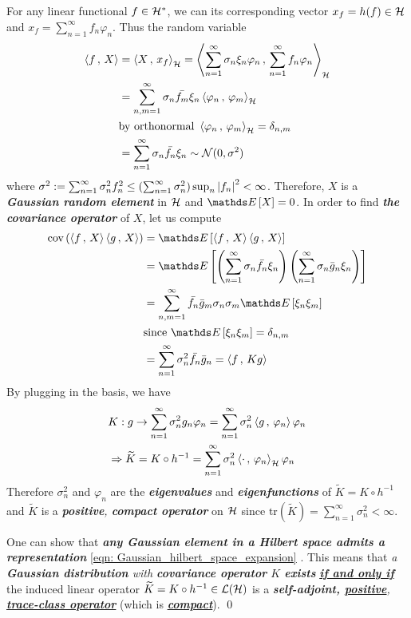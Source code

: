 \documentclass[11pt]{article}
\begin{document}
\begin{itemize}
\begin{example}
For any linear functional $f \in {\mathcal H}^{*}$, we can its corresponding vector $x_f = h(f) \in {\mathcal H}$ and $x_f = \sum_{n=1}^{\infty}f_n \varphi_n$. Thus the random variable
\begin{align*}
\left\langle f\,,\, X \right\rangle &= \left\langle X\,,\, x_f \right\rangle_{{\mathcal H}} = \left\langle \sum_{n=1}^{\infty}\sigma_n \xi_n \varphi_n\,,\, \sum_{n=1}^{\infty}f_n \varphi_n \right\rangle_{{\mathcal H}} \\
&= \sum_{n,m=1}^{\infty}\sigma_n  \bar{f_m} \xi_n \left\langle  \varphi_n\,,\,  \varphi_m \right\rangle_{{\mathcal H}} \\
& \text{by orthonormal }  \left\langle  \varphi_n\,,\,  \varphi_m \right\rangle_{{\mathcal H}} = \delta_{n,m}\\
&= \sum_{n=1}^{\infty}\sigma_n  \bar{f_n} \xi_n \sim {\mathcal N}(0, \sigma^2)
\end{align*} where $\sigma^2 := \sum_{n=1}^{\infty}\sigma_n^2  f_n^2 \le  (\sum_{n=1}^{\infty}\sigma_n^2)\sup_{n}{\left\lvert f_n \right\rvert^2}< \infty$. Therefore, $X$ is a
\emph{\textbf{Gaussian random element}} in ${\mathcal H}$ and $\E{}{X} = 0$. In order to find \emph{\textbf{the covariance operator}} of $X$, let us
compute
\begin{align*}
\text{cov}\paren{\inn{f}{X} \inn{g}{X}} &= \E{}{\inn{f}{X} \inn{g}{X}}\\
&=  \E{}{\paren{\sum_{n=1}^{\infty}\sigma_n  \bar{f_n} \xi_n } \paren{\sum_{n=1}^{\infty}\sigma_n  \bar{g}_n \xi_n }}\\
&= \sum_{n,m=1}^{\infty}\bar{f_n} \bar{g}_m\sigma_n \sigma_m  \E{}{\xi_n \xi_m} \\
& \text{since }  \E{}{\xi_n \xi_m} = \delta_{n,m}\\
&= \sum_{n=1}^{\infty}\sigma_n^2 \bar{f_n} \bar{g}_n = \inn{f}{Kg}
\end{align*}
By plugging in the basis, we have
\begin{align}
 &K:  g \rightarrow \sum_{n=1}^{\infty}\sigma_n^2 g_n \varphi_n = \sum_{n=1}^{\infty}\sigma_n^2 \left\langle g\,,\, \varphi_n \right\rangle \varphi_n \label{eqn: Gaussian_covariance_random_hilbert_1} \\
&\Rightarrow \widetilde{K} = K \circ h^{-1} =  \sum_{n=1}^{\infty}\sigma_n^2 \left\langle \cdot\,,\, \varphi_n \right\rangle_{{\mathcal H}} \varphi_n \label{eqn: Gaussian_covariance_random_hilbert_2}
\end{align} Therefore $\sigma_n^2$ and $\varphi_n$ are the \emph{\textbf{eigenvalues}} and \emph{\textbf{eigenfunctions}} of $\widetilde{K}= K \circ h^{-1}$ and $\widetilde{K}$ is a \emph{\textbf{positive}, \textbf{compact operator}} on ${\mathcal H}$ since $\text{tr}(\widetilde{K}) =  \sum_{n=1}^{\infty}\sigma_n^2 < \infty$.

One can show that \emph{\textbf{any Gaussian element in a Hilbert space admits a representation}} \eqref{eqn: Gaussian_hilbert_space_expansion} \citep{lifshits2012lectures}. This means that \emph{a \textbf{Gaussian distribution} with \textbf{covariance operator} $K$ \textbf{exists}} \underline{\emph{\textbf{if and only if}}} the induced linear operator $\widetilde{K}= K \circ h^{-1} \in {\mathcal L}({\mathcal H})$ is a \emph{\textbf{self-adjoint, \underline{positive}}, \underline{\textbf{trace-class operator}}} (which is \underline{\emph{\textbf{compact}}}). \qed


\end{example}
\end{itemize}
\end{document}
